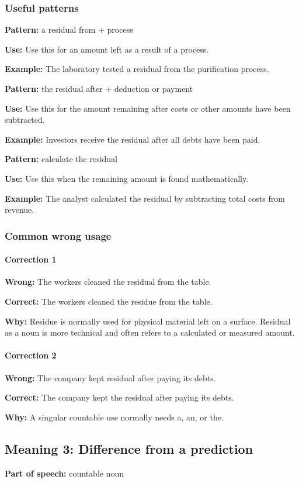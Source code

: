 \documentclass[11pt]{article}
\begin{document}
\subsubsection{Useful patterns}
\textbf{Pattern:} a residual from + process

\textbf{Use:} Use this for an amount left as a result of a process.

\textbf{Example:} The laboratory tested a residual from the purification process.

\textbf{Pattern:} the residual after + deduction or payment

\textbf{Use:} Use this for the amount remaining after costs or other amounts have been subtracted.

\textbf{Example:} Investors receive the residual after all debts have been paid.

\textbf{Pattern:} calculate the residual

\textbf{Use:} Use this when the remaining amount is found mathematically.

\textbf{Example:} The analyst calculated the residual by subtracting total costs from revenue.

\subsubsection{Common wrong usage}
\paragraph{Correction 1}
\textbf{Wrong:} The workers cleaned the residual from the table.

\textbf{Correct:} The workers cleaned the residue from the table.

\textbf{Why:} Residue is normally used for physical material left on a surface. Residual as a noun is more technical and often refers to a calculated or measured amount.

\paragraph{Correction 2}
\textbf{Wrong:} The company kept residual after paying its debts.

\textbf{Correct:} The company kept the residual after paying its debts.

\textbf{Why:} A singular countable use normally needs a, an, or the.

\subsection{Meaning 3: Difference from a prediction}
\textbf{Part of speech:} countable noun
\end{document}

